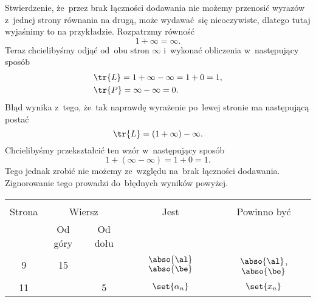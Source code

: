 \vspace{\spaceFour}


\start {} Stwierdzenie, że~przez brak łączności dodawania nie
możemy przenosić wyrazów z~jednej strony równania na drugą, może
wydawać~się nieoczywiste, dlatego tutaj wyjaśnimy to na przykładzie.
Rozpatrzmy równość
\begin{equation}
  \label{eq:Lojasiewicz-06}
  1 + \infty = \infty.
\end{equation}
Teraz chcielibyśmy odjąć od~obu stron $\infty$ i~wykonać obliczenia
w~następujący sposób
\begin{equation}
  \label{eq:Lojasiewicz-07}
  \begin{split}
    &\tr{L} = 1 + \infty - \infty = 1 + 0 = 1, \\
    &\tr{P} = \infty - \infty = 0.
  \end{split}
\end{equation}
Błąd wynika z~tego, że~tak naprawdę wyrażenie po~lewej stronie ma
następującą postać
\begin{equation}
  \label{eq:Lojasiewicz-08}
  \tr{L} = ( 1 + \infty ) - \infty.
\end{equation}
Chcielibyśmy przekształcić ten wzór w~następujący sposób
\begin{equation}
  \label{eq:Lojasiewicz-09}
  1 + ( \infty - \infty ) = 1 + 0 = 1.
\end{equation}
Tego jednak zrobić nie możemy ze~względu na~brak łączności dodawania.
Zignorowanie tego prowadzi do~błędnych wyników powyżej.

\vspace{\spaceFour}



\begin{center}
  \begin{tabular}{|c|c|c|c|c|}
    \hline
    & \multicolumn{2}{c|}{} & & \\
    Strona & \multicolumn{2}{c|}{Wiersz} & Jest
                              & Powinno być \\ \cline{2-3}
    & Od góry & Od dołu & & \\
    \hline
    9   & 15 & & $\abso{ \al }$ $\abso{ \be }$
           & $\abso{ \al }$, $\abso{ \be }$ \\
    11  & &  5 & $\set{ \alpha_{ n } }$ & $\set{ x_{ n } }$ \\
    \hline
  \end{tabular}
\end{center}

